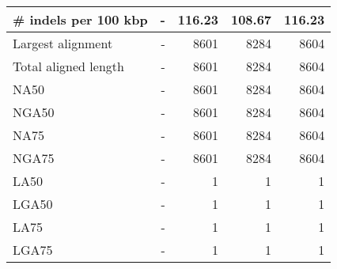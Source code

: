\documentclass[12pt,a4paper]{article}
\begin{document}
\begin{table}[ht]
\begin{center}
\begin{tabular}{|l*{4}{|r}|}
\# indels per 100 kbp & - & 116.23 & 108.67 & 116.23 \\ \hline
Largest alignment & - & 8601 & 8284 & 8604 \\ \hline
Total aligned length & - & 8601 & 8284 & 8604 \\ \hline
NA50 & - & 8601 & 8284 & 8604 \\ \hline
NGA50 & - & 8601 & 8284 & 8604 \\ \hline
NA75 & - & 8601 & 8284 & 8604 \\ \hline
NGA75 & - & 8601 & 8284 & 8604 \\ \hline
LA50 & - & 1 & 1 & 1 \\ \hline
LGA50 & - & 1 & 1 & 1 \\ \hline
LA75 & - & 1 & 1 & 1 \\ \hline
LGA75 & - & 1 & 1 & 1 \\ \hline
\end{tabular}
\end{center}
\end{table}
\end{document}
